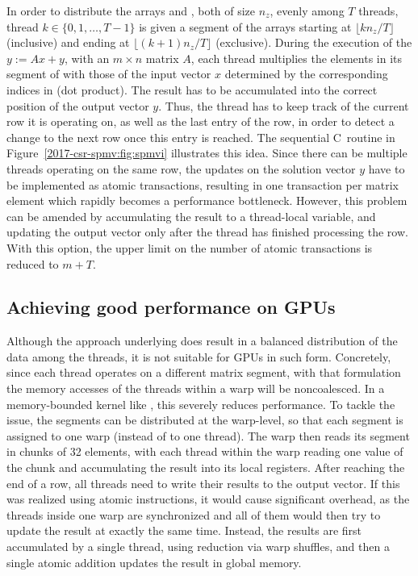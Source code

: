 In order to distribute the arrays \val and \colidx, both of size $n_z$,
evenly among $T$ threads,
thread $k \in \lbrace 0,1, \ldots, T-1 \rbrace$ is given
a segment of the arrays starting at $\lfloor kn_z / T\rfloor$ (inclusive)
and ending at $\lfloor (k+1)n_z/T\rfloor$ (exclusive).
During the execution of the \spmv $y:=Ax + y$, with an $m \times n$ matrix $A$,
each thread multiplies 
the elements in its segment of \val with those of the input vector $x$
determined by the corresponding indices in \colidx (dot product).
The result has to be accumulated into the correct position
of the output vector $y$.
Thus, the thread has to keep track of the current row it is operating on,
as well as the last entry of the row,
in order to detect a change to the next row once this entry is reached.
The sequential C~routine in Figure~\ref{2017-csr-spmv:fig:spmvi} illustrates this idea.
Since there can be multiple threads operating on the same row,
the updates on the solution vector $y$ have to be implemented
as atomic transactions,
resulting in one transaction per matrix element
which rapidly becomes a performance bottleneck.
However, this problem can be amended
by accumulating the result to a thread-local variable,
and updating the output vector only
after the thread has finished processing the row.
With this option, the upper limit on the number of atomic transactions
is reduced to $m + T$.

\subsection{Achieving good performance on GPUs}

Although the approach underlying \bcsr does result
in a balanced distribution of the data among the threads,
it is not suitable for GPUs in such form.
Concretely, since each thread operates on a different matrix segment,
with that formulation the memory accesses of the threads within a warp
will be noncoalesced.
In a memory-bounded kernel like \spmv, this severely reduces performance.
To tackle the issue, the segments can be distributed at the warp-level,
so that each segment is assigned to one warp (instead of to one thread).
The warp then reads its segment in chunks of 32 elements,
with each thread within the warp reading one value of the chunk
and accumulating the result into its local registers.
After reaching the end of a row,
all threads need to write their results to the output vector.
If this was realized using atomic instructions,
it would cause significant overhead,
as the threads inside one warp are synchronized
and all of them would then try to update the result at exactly the same time.
Instead, the results are first accumulated
by a single thread, using reduction via warp shuffles,
and then a single atomic addition updates the result in global memory.

